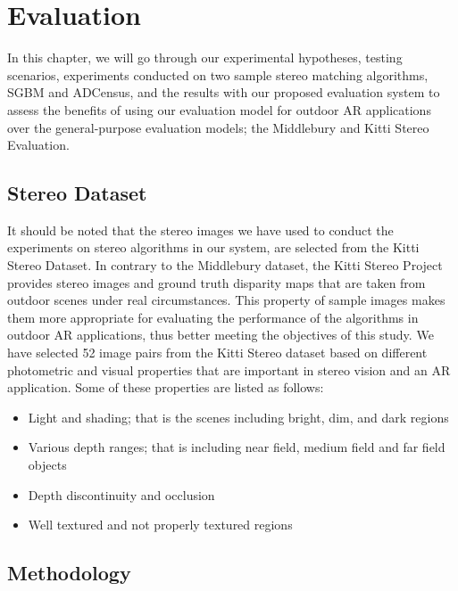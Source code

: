 \chapter{Evaluation}
\label{chap:Evaluation}
\renewcommand{\arraystretch}{0.5}

In this chapter, we will go through our experimental hypotheses, testing scenarios, experiments conducted on two sample 
stereo matching algorithms, SGBM and ADCensus, and the results with our
proposed evaluation system to assess the benefits of using our evaluation model for outdoor AR applications over the general-purpose evaluation models; 
the Middlebury and Kitti Stereo Evaluation.

\section{Stereo Dataset}
It should be noted that the stereo images we have used to conduct the experiments on stereo algorithms in our system,
are selected from the Kitti Stereo Dataset.
In contrary to the Middlebury dataset, the Kitti Stereo Project provides stereo images and ground truth disparity maps
that are taken from outdoor scenes under real circumstances. This property of sample images makes them more appropriate 
for evaluating the performance of the algorithms in outdoor AR applications, thus better meeting the objectives of this study.
We have selected 52 image pairs from the Kitti Stereo dataset based on different photometric and visual properties that are important
in stereo vision and an AR application. Some 
of these properties are listed as follows:
\begin{itemize}
\item Light and shading; that is the scenes including bright, dim, and dark regions
\item Various depth ranges; that is including near field, medium field and far field objects  
\item Depth discontinuity and occlusion
\item Well textured and not properly textured regions
\end{itemize}


\section{Methodology}

